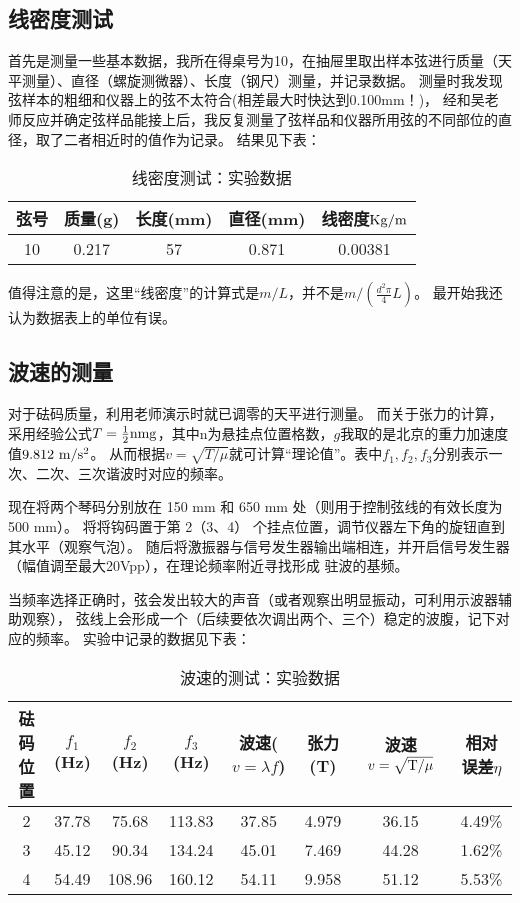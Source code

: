 \documentclass[11pt]{article}
\begin{document}
\subsection{线密度测试}

首先是测量一些基本数据，我所在得桌号为10，在抽屉里取出样本弦进行质量（天平测量）、直径（螺旋测微器）、长度（钢尺）测量，并记录数据。
测量时我发现弦样本的粗细和仪器上的弦不太符合(相差最大时快达到0.100{mm}！)，
经和吴老师反应并确定弦样品能接上后，我反复测量了弦样品和仪器所用弦的不同部位的直径，取了二者相近时的值作为记录。
结果见下表：
\begin{table}[H]
    \centering
    \caption{线密度测试：实验数据}
    \begin{tabular}{ccccc}
        \toprule
        弦号 & 质量(g) & 长度(mm) & 直径(mm) & 线密度$\rm Kg/m$ \\ 
        \midrule
        10 & 0.217 & 57 & 0.871 & 0.00381 \\ 
        \bottomrule
    \end{tabular}
\end{table}

值得注意的是，这里“线密度”的计算式是$m/L$，并不是$m/(\frac{d^2\pi}{4}L)$。
最开始我还认为数据表上的单位有误。


\subsection{波速的测量}
对于砝码质量，利用老师演示时就已调零的天平进行测量。
而关于张力的计算，采用经验公式$T=\frac{1}{2}\rm nmg$，其中n为悬挂点位置格数，$g$我取的是北京的重力加速度值$9.812\,\,{\rm m/s^2}$。
从而根据$v=\sqrt{T/\mu}$就可计算“理论值”。表中$f_1,f_2,f_3$分别表示一次、二次、三次谐波时对应的频率。

现在将两个琴码分别放在 150 mm 和 650 mm 处（则用于控制弦线的有效长度为 500 mm）。
将将钩码置于第 2（3、4） 个挂点位置，调节仪器左下角的旋钮直到其水平（观察气泡）。
随后将激振器与信号发生器输出端相连，并开启信号发生器（幅值调至最大20Vpp），在理论频率附近寻找形成
驻波的基频。

当频率选择正确时，弦会发出较大的声音（或者观察出明显振动，可利用示波器辅助观察），
弦线上会形成一个（后续要依次调出两个、三个）稳定的波腹，记下对应的频率。
实验中记录的数据见下表：
\begin{table}[H]
    \centering
    \caption{波速的测试：实验数据}
    \begin{tabular}{cccccccc}
        \toprule
        砝码位置 & $f_1$(Hz) & $f_2$(Hz)  & $f_3$(Hz)  & 波速($v=\lambda f$) & 张力(T) & 波速$v=\sqrt{{\rm T}/ \mu }$ & 相对误差$\eta$ \\ 
        \midrule
        2 & 37.78 & 75.68 & 113.83 & 37.85 & 4.979 & 36.15 & 4.49\% \\ 
        3 & 45.12 & 90.34 & 134.24 & 45.01 & 7.469 & 44.28 & 1.62\% \\ 
        4 & 54.49 & 108.96 & 160.12 & 54.11 & 9.958 & 51.12 & 5.53\% \\ 
        \bottomrule
    \end{tabular}
\end{table}
\end{document}
